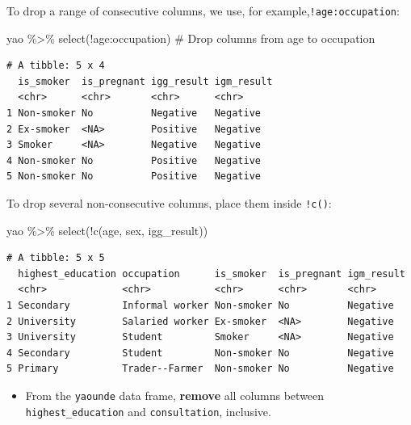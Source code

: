 \documentclass[
  letterpaper,
  DIV=11,
  numbers=noendperiod]{scrreprt}
\newenvironment{Shaded}{\begin{snugshade}}{\end{snugshade}}
\newcommand{\CommentTok}[1]{\textcolor[rgb]{0.37,0.37,0.37}{#1}}
\newcommand{\FunctionTok}[1]{\textcolor[rgb]{0.28,0.35,0.67}{#1}}
\newcommand{\NormalTok}[1]{\textcolor[rgb]{0.00,0.23,0.31}{#1}}
\newcommand{\SpecialCharTok}[1]{\textcolor[rgb]{0.37,0.37,0.37}{#1}}
\providecommand{\tightlist}{%
  \setlength{\itemsep}{0pt}\setlength{\parskip}{0pt}}\usepackage{longtable,booktabs,array}
\begin{document}
To drop a range of consecutive columns, we use, for
example,\texttt{!age:occupation}:

\begin{Shaded}
\begin{Highlighting}[]
\NormalTok{yao }\SpecialCharTok{\%\textgreater{}\%} \FunctionTok{select}\NormalTok{(}\SpecialCharTok{!}\NormalTok{age}\SpecialCharTok{:}\NormalTok{occupation) }\CommentTok{\# Drop columns from \textasciigrave{}age\textasciigrave{} to \textasciigrave{}occupation\textasciigrave{}}
\end{Highlighting}
\end{Shaded}

\begin{verbatim}
# A tibble: 5 x 4
  is_smoker  is_pregnant igg_result igm_result
  <chr>      <chr>       <chr>      <chr>     
1 Non-smoker No          Negative   Negative  
2 Ex-smoker  <NA>        Positive   Negative  
3 Smoker     <NA>        Negative   Negative  
4 Non-smoker No          Positive   Negative  
5 Non-smoker No          Positive   Negative  
\end{verbatim}

To drop several non-consecutive columns, place them inside
\texttt{!c()}:

\begin{Shaded}
\begin{Highlighting}[]
\NormalTok{yao }\SpecialCharTok{\%\textgreater{}\%} \FunctionTok{select}\NormalTok{(}\SpecialCharTok{!}\FunctionTok{c}\NormalTok{(age, sex, igg\_result))}
\end{Highlighting}
\end{Shaded}

\begin{verbatim}
# A tibble: 5 x 5
  highest_education occupation      is_smoker  is_pregnant igm_result
  <chr>             <chr>           <chr>      <chr>       <chr>     
1 Secondary         Informal worker Non-smoker No          Negative  
2 University        Salaried worker Ex-smoker  <NA>        Negative  
3 University        Student         Smoker     <NA>        Negative  
4 Secondary         Student         Non-smoker No          Negative  
5 Primary           Trader--Farmer  Non-smoker No          Negative  
\end{verbatim}

\begin{tcolorbox}[enhanced jigsaw, titlerule=0mm, colback=white, left=2mm, breakable, opacitybacktitle=0.6, colbacktitle=quarto-callout-tip-color!10!white, colframe=quarto-callout-tip-color-frame, bottomtitle=1mm, opacityback=0, coltitle=black, arc=.35mm, toptitle=1mm, title=\textcolor{quarto-callout-tip-color}{\faLightbulb}\hspace{0.5em}{Practice}, leftrule=.75mm, toprule=.15mm, bottomrule=.15mm, rightrule=.15mm]

\begin{itemize}
\tightlist
\item
  From the \texttt{yaounde} data frame, \textbf{remove} all columns
  between \texttt{highest\_education} and \texttt{consultation},
  inclusive.
\end{itemize}

\end{tcolorbox}
\end{document}
